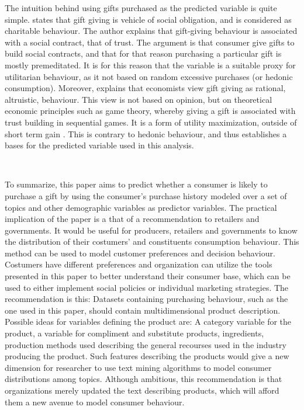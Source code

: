 The intuition behind using gifts purchased as the predicted variable is quite simple. \cite{Sherry} states that gift giving is vehicle of social obligation, and is considered as charitable behaviour. The author explains that gift-giving behaviour is associated with a social contract, that of trust. The argument is that consumer give gifts to build social contracts, and that for that reason purchasing a particular gift is mostly premeditated. It is for this reason that the variable is a suitable proxy for utilitarian behaviour, as it not based on random excessive purchases (or hedonic consumption). Moreover, \cite{andreoni2002giving} explains that economists view gift giving as rational, altruistic, behaviour. This view is not based on opinion, but on theoretical economic principles such as game theory, whereby giving a gift is associated with trust building in sequential games. It is a form of utility maximization, outside of short term gain \citep{andreoni2002giving}. This is contrary to hedonic behaviour, and thus establishes a bases for the predicted variable used in this analysis. 


\


To summarize, this paper aims to predict whether a consumer is likely to purchase a gift by using the consumer's purchase history modeled over a set of topics and other demographic variables as predictor variables. The practical implication of the paper is a that of a recommendation to retailers and governments. It would be useful for producers, retailers and governments to know the distribution of their costumers' and constituents consumption behaviour. This method can be used to model customer preferences and decision behaviour. Costumers have different preferences and organization can utilize the tools presented in this paper to better understand their consumer base, which can be used to either implement social policies or individual marketing strategies. The recommendation is this: Datasets containing purchasing behaviour, such as the one used in this paper, should contain multidimensional product description. Possible ideas for variables defining the product are: A category variable for the product, a variable for compliment and substitute products, ingredients, production methods used describing the general recourses used in the industry producing the product. Such features describing the products would give a new dimension for researcher to use text mining algorithms to model consumer distributions among topics. Although ambitious, this recommendation is that organizations merely updated the text describing products, which will afford them a new avenue to model consumer behaviour. 


